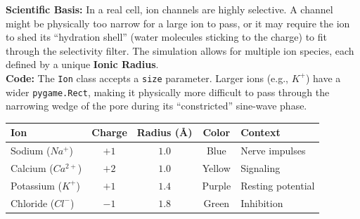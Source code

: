 \documentclass[11pt]{article}
\begin{document}
\begin{tcolorbox}[colback=yellow!5, colframe=yellow!50!black,title=Game Mechanic: Ion Size]
	\textbf{Scientific Basis:} In a real cell, ion channels are highly selective. A channel might be physically too narrow for a large ion to pass, or it may require the ion to shed its ``hydration shell'' (water molecules sticking to the charge) to fit through the selectivity filter. The simulation allows for multiple ion species, each defined by a unique \textbf{Ionic Radius}.\\

	\textbf{Code:}
	The \texttt{Ion} class accepts a \texttt{size} parameter. Larger ions (e.g., $K^{+}$) have a wider \texttt{pygame.Rect}, making it physically more difficult to pass through the narrowing wedge of the pore during its ``constricted'' sine-wave phase.

	\centering
	{\small
    \label{tab:ions}
	\begin{tabular}{l|c|c|c|l}
		\toprule
		\textbf{Ion} & \textbf{Charge} & \textbf{Radius (\AA)} & \textbf{Color} & \textbf{Context} \\
		\midrule
		Sodium ($Na^+$)    & $+1$ & $1.0$ & {\color{MidnightBlue}Blue}  & Nerve impulses \\
		Calcium ($Ca^{2+}$)& $+2$ & $1.0$ & {\color{Goldenrod}Yellow}   & Signaling \\
		Potassium ($K^+$)  & $+1$ & $1.4$ & {\color{RoyalPurple}Purple} & Resting potential \\
		Chloride ($Cl^-$)  & $-1$ & $1.8$ & {\color{ForestGreen}Green}   & Inhibition \\
		\bottomrule
	\end{tabular}
	}

\end{tcolorbox}
\end{document}
